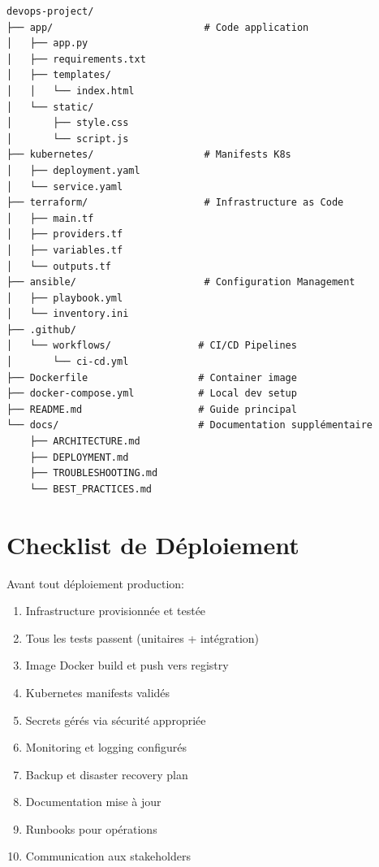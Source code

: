 \documentclass[12pt,a4paper]{report}
\begin{document}
\begin{lstlisting}
devops-project/
├── app/                          # Code application
│   ├── app.py
│   ├── requirements.txt
│   ├── templates/
│   │   └── index.html
│   └── static/
│       ├── style.css
│       └── script.js
├── kubernetes/                   # Manifests K8s
│   ├── deployment.yaml
│   └── service.yaml
├── terraform/                    # Infrastructure as Code
│   ├── main.tf
│   ├── providers.tf
│   ├── variables.tf
│   └── outputs.tf
├── ansible/                      # Configuration Management
│   ├── playbook.yml
│   └── inventory.ini
├── .github/
│   └── workflows/               # CI/CD Pipelines
│       └── ci-cd.yml
├── Dockerfile                   # Container image
├── docker-compose.yml           # Local dev setup
├── README.md                    # Guide principal
└── docs/                        # Documentation supplémentaire
    ├── ARCHITECTURE.md
    ├── DEPLOYMENT.md
    ├── TROUBLESHOOTING.md
    └── BEST_PRACTICES.md
\end{lstlisting}

\section{Checklist de Déploiement}

Avant tout déploiement production:

\begin{enumerate}
    \item[] \checkmark Infrastructure provisionnée et testée
    \item[] \checkmark Tous les tests passent (unitaires + intégration)
    \item[] \checkmark Image Docker build et push vers registry
    \item[] \checkmark Kubernetes manifests validés
    \item[] \checkmark Secrets gérés via sécurité appropriée
    \item[] \checkmark Monitoring et logging configurés
    \item[] \checkmark Backup et disaster recovery plan
    \item[] \checkmark Documentation mise à jour
    \item[] \checkmark Runbooks pour opérations
    \item[] \checkmark Communication aux stakeholders
\end{enumerate}

\newpage

\end{document}
